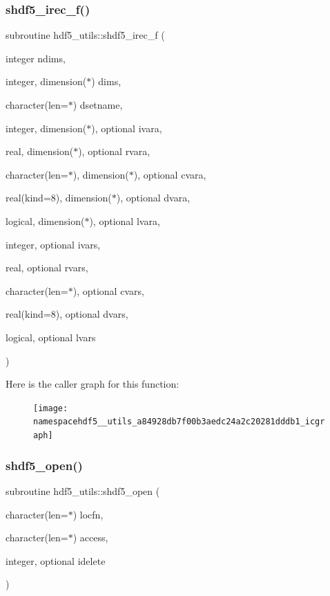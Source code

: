 \subsubsection{\texorpdfstring{shdf5\+\_\+irec\+\_\+f()}{shdf5\_irec\_f()}}
{\footnotesize\ttfamily subroutine hdf5\+\_\+utils\+::shdf5\+\_\+irec\+\_\+f (\begin{DoxyParamCaption}\item[{integer}]{ndims,  }\item[{integer, dimension($\ast$)}]{dims,  }\item[{character(len=$\ast$)}]{dsetname,  }\item[{integer, dimension($\ast$), optional}]{ivara,  }\item[{real, dimension($\ast$), optional}]{rvara,  }\item[{character(len=$\ast$), dimension($\ast$), optional}]{cvara,  }\item[{real(kind=8), dimension($\ast$), optional}]{dvara,  }\item[{logical, dimension($\ast$), optional}]{lvara,  }\item[{integer, optional}]{ivars,  }\item[{real, optional}]{rvars,  }\item[{character(len=$\ast$), optional}]{cvars,  }\item[{real(kind=8), optional}]{dvars,  }\item[{logical, optional}]{lvars }\end{DoxyParamCaption})}

Here is the caller graph for this function\+:
\nopagebreak
\begin{figure}[H]
\begin{center}
\leavevmode
\texttt{[image: namespacehdf5\_\_utils\_a84928db7f00b3aedc24a2c20281dddb1\_icgraph]}
\end{center}
\end{figure}
\mbox{\label{namespacehdf5__utils_a8324e53f06756f48c91f3735f9d26640}} 
\subsubsection{\texorpdfstring{shdf5\+\_\+open()}{shdf5\_open()}}
{\footnotesize\ttfamily subroutine hdf5\+\_\+utils\+::shdf5\+\_\+open (\begin{DoxyParamCaption}\item[{character(len=$\ast$)}]{locfn,  }\item[{character(len=$\ast$)}]{access,  }\item[{integer, optional}]{idelete }\end{DoxyParamCaption})}

